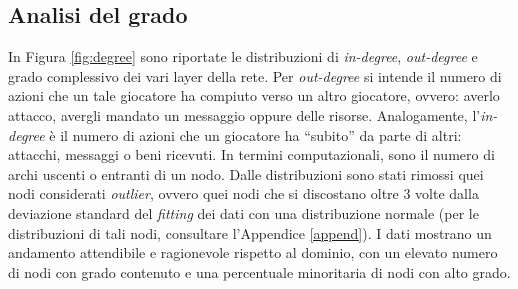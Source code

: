 \subsection{Analisi del grado}
\label{subsec:grado}
In Figura \ref{fig:degree} sono riportate le distribuzioni di \textit{in-degree}, \textit{out-degree} e grado complessivo dei vari layer della rete. Per \textit{out-degree} si intende il numero di azioni che un tale giocatore ha compiuto verso un altro giocatore, ovvero: averlo attacco, avergli mandato un messaggio oppure delle risorse. Analogamente, l'\textit{in-degree} è il numero di azioni che un giocatore ha “subito” da parte di altri: attacchi, messaggi o beni ricevuti. In termini computazionali, sono il numero di archi uscenti o entranti di un nodo. Dalle distribuzioni sono stati rimossi quei nodi considerati \textit{outlier}, ovvero quei nodi che si discostano oltre 3 volte dalla deviazione standard del \textit{fitting} dei dati con una distribuzione normale (per le distribuzioni di tali nodi, consultare l'Appendice \ref{append}). I dati mostrano un andamento attendibile e ragionevole rispetto al dominio, con un elevato numero di nodi con grado contenuto e una percentuale minoritaria di nodi con alto grado.\\
